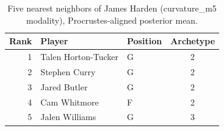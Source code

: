 \begin{table}[htbp]
  \centering\small
  \begin{tabular}{rllc}
    \toprule
    Rank & Player & Position & Archetype \\
    \midrule
    1 & Talen Horton-Tucker & G & 2 \\
    2 & Stephen Curry & G & 2 \\
    3 & Jared Butler & G & 2 \\
    4 & Cam Whitmore & F & 2 \\
    5 & Jalen Williams & G & 3 \\
    \bottomrule
  \end{tabular}
  \caption{Five nearest neighbors of James Harden (curvature_m5 modality), Procrustes-aligned posterior mean.}
  \label{tab:James_Harden_neighbors_curvature_m5}
\end{table}

